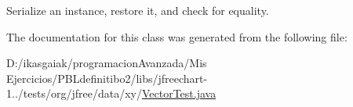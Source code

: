 Serialize an instance, restore it, and check for equality. 

The documentation for this class was generated from the following file\+:\begin{DoxyCompactItemize}
\item 
D\+:/ikasgaiak/programacion\+Avanzada/\+Mis Ejercicios/\+P\+B\+Ldefinitibo2/libs/jfreechart-\/1../tests/org/jfree/data/xy/\mbox{\hyperlink{_vector_test_8java}{Vector\+Test.\+java}}\end{DoxyCompactItemize}
